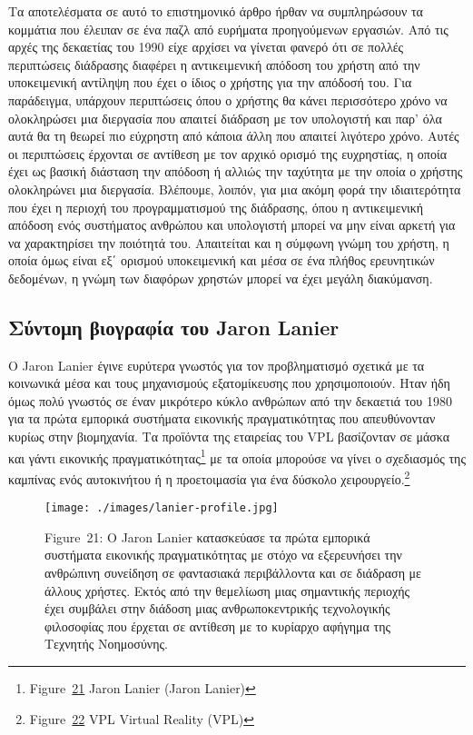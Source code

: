 \documentclass[
]{article}
\begin{document}
Τα αποτελέσματα σε αυτό το επιστημονικό άρθρο ήρθαν να συμπληρώσουν τα
κομμάτια που έλειπαν σε ένα παζλ από ευρήματα προηγούμενων εργασιών. Από
τις αρχές της δεκαετίας του 1990 είχε αρχίσει να γίνεται φανερό ότι σε
πολλές περιπτώσεις διάδρασης διαφέρει η αντικειμενική απόδοση του χρήστη
από την υποκειμενική αντίληψη που έχει ο ίδιος ο χρήστης για την απόδοσή
του. Για παράδειγμα, υπάρχουν περιπτώσεις όπου ο χρήστης θα κάνει
περισσότερο χρόνο να ολοκληρώσει μια διεργασία που απαιτεί διάδραση με
τον υπολογιστή και παρ' όλα αυτά θα τη θεωρεί πιο εύχρηστη από κάποια
άλλη που απαιτεί λιγότερο χρόνο. Αυτές οι περιπτώσεις έρχονται σε
αντίθεση με τον αρχικό ορισμό της ευχρηστίας, η οποία έχει ως βασική
διάσταση την απόδοση ή αλλιώς την ταχύτητα με την οποία ο χρήστης
ολοκληρώνει μια διεργασία. Βλέπουμε, λοιπόν, για μια ακόμη φορά την
ιδιαιτερότητα που έχει η περιοχή του προγραμματισμού της διάδρασης, όπου
η αντικειμενική απόδοση ενός συστήματος ανθρώπου και υπολογιστή μπορεί
να μην είναι αρκετή για να χαρακτηρίσει την ποιότητά του. Απαιτείται και
η σύμφωνη γνώμη του χρήστη, η οποία όμως είναι εξ΄ ορισμού υποκειμενική
και μέσα σε ένα πλήθος ερευνητικών δεδομένων, η γνώμη των διαφόρων
χρηστών μπορεί να έχει μεγάλη διακύμανση.

\hypertarget{ux3c3ux3cdux3bdux3c4ux3bfux3bcux3b7-ux3b2ux3b9ux3bfux3b3ux3c1ux3b1ux3c6ux3afux3b1-ux3c4ux3bfux3c5-jaron-lanier}{%
\subsection{Σύντομη βιογραφία του Jaron
Lanier}\label{ux3c3ux3cdux3bdux3c4ux3bfux3bcux3b7-ux3b2ux3b9ux3bfux3b3ux3c1ux3b1ux3c6ux3afux3b1-ux3c4ux3bfux3c5-jaron-lanier}}

Ο Jaron Lanier έγινε ευρύτερα γνωστός για τον προβληματισμό σχετικά με
τα κοινωνικά μέσα και τους μηχανισμούς εξατομίκευσης που χρησιμοποιούν.
Ηταν ήδη όμως πολύ γνωστός σε έναν μικρότερο κύκλο ανθρώπων από την
δεκαετιά του 1980 για τα πρώτα εμπορικά συστήματα εικονικής
πραγματικότητας που απευθύνονταν κυρίως στην βιομηχανία. Τα προϊόντα της
εταιρείας του VPL βασίζονταν σε μάσκα και γάντι εικονικής
πραγματικότητας\footnote{Figure~\protect\hyperlink{fig:lanier-profile}{21}
  Jaron Lanier (Jaron Lanier)} με τα οποία μπορούσε να γίνει ο
σχεδιασμός της καμπίνας ενός αυτοκινήτου ή η προετοιμασία για ένα
δύσκολο χειρουργείο.\footnote{Figure~\protect\hyperlink{fig:vpl-virtual-reality}{22}
  VPL Virtual Reality (VPL)}

\leavevmode{}%
\begin{figure}
\hypertarget{fig:lanier-profile}{%
\centering
\texttt{[image: ./images/lanier-profile.jpg]}
\caption{Figure~21: Ο Jaron Lanier κατασκεύασε τα πρώτα εμπορικά
συστήματα εικονικής πραγματικότητας με στόχο να εξερευνήσει την
ανθρώπινη συνείδηση σε φαντασιακά περιβάλλοντα και σε διάδραση με άλλους
χρήστες. Εκτός από την θεμελίωση μιας σημαντικής περιοχής έχει συμβάλει
στην διάδοση μιας ανθρωποκεντρικής τεχνολογικής φιλοσοφίας που έρχεται
σε αντίθεση με το κυρίαρχο αφήγημα της Τεχνητής
Νοημοσύνης.}\label{fig:lanier-profile}
}
\end{figure}
\end{document}
